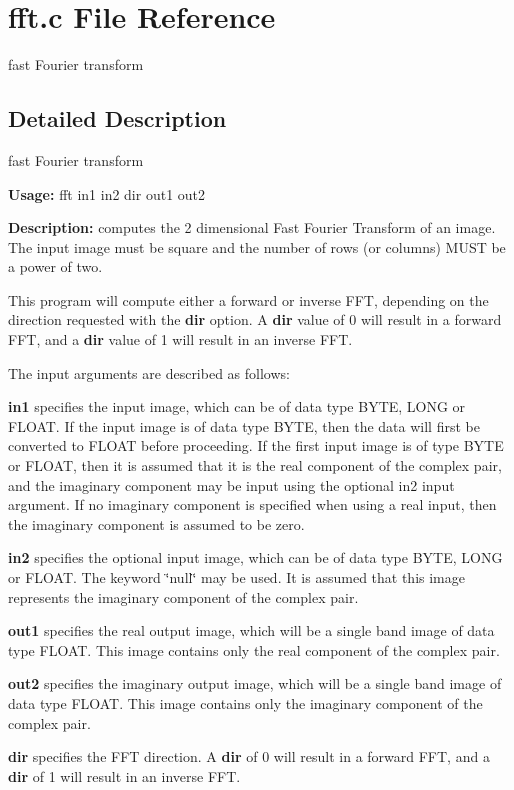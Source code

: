 \section{fft.c File Reference}
\label{fft_8c}
fast Fourier transform  




\label{_details}
\subsection{Detailed Description}
fast Fourier transform 

{\bf Usage:} fft in1 in2 dir out1 out2

{\bf Description:} computes the 2 dimensional Fast Fourier Transform of an image. The input image must be square and the number of rows (or columns) MUST be a power of two.

This program will compute either a forward or inverse FFT, depending on the direction requested with the {\bf dir} option. A {\bf dir} value of 0 will result in a forward FFT, and a {\bf dir} value of 1 will result in an inverse FFT.

The input arguments are described as follows:

{\bf in1} specifies the input image, which can be of data type BYTE, LONG or FLOAT. If the input image is of data type BYTE, then the data will first be converted to FLOAT before proceeding. If the first input image is of type BYTE or FLOAT, then it is assumed that it is the real component of the complex pair, and the imaginary component may be input using the optional in2 input argument. If no imaginary component is specified when using a real input, then the imaginary component is assumed to be zero.

{\bf in2} specifies the optional input image, which can be of data type BYTE, LONG or FLOAT. The keyword \char`\"{}null\char`\"{} may be used. It is assumed that this image represents the imaginary component of the complex pair.

{\bf out1} specifies the real output image, which will be a single band image of data type FLOAT. This image contains only the real component of the complex pair.

{\bf out2} specifies the imaginary output image, which will be a single band image of data type FLOAT. This image contains only the imaginary component of the complex pair.

{\bf dir} specifies the FFT direction. A {\bf dir} of 0 will result in a forward FFT, and a {\bf dir} of 1 will result in an inverse FFT.

